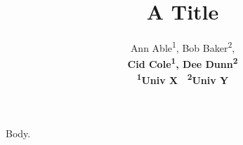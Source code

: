 \documentclass{article}
\begin{document}
\title{A Title}
\author{Ann Able\textsuperscript{\rm 1}, Bob Baker\textsuperscript{\rm 2}, \\ \bf \Large \textbf{Cid Cole\textsuperscript{\rm 1}, Dee Dunn\textsuperscript{\rm 2}}\\
\textsuperscript{\rm 1}Univ X \
\textsuperscript{\rm 2}Univ Y}
\maketitle
Body.
\end{document}
